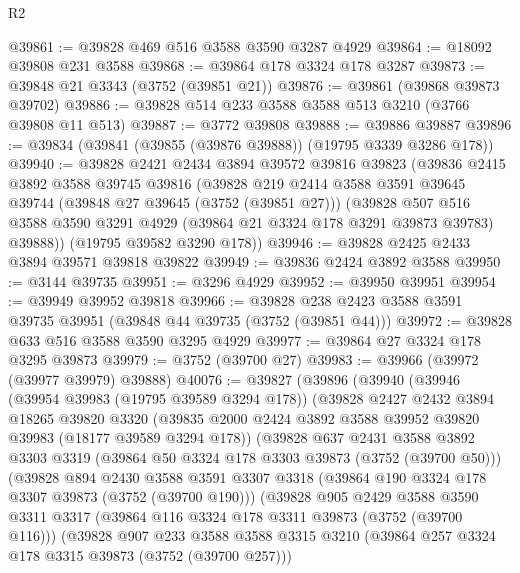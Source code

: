 \begin{lexlean}{R2}
\begin{coremodule}
@39861 := @39828 @469 @516 @3588 @3590 @3287 @4929
@39864 := @18092 @39808 @231 @3588
@39868 := @39864 @178 @3324 @178 @3287
@39873 := @39848 @21 @3343 (@3752 (@39851 @21))
@39876 := @39861 (@39868 @39873 @39702)
@39886 := @39828 @514 @233 @3588 @3588 @513 @3210 (@3766 @39808 @11 @513)
@39887 := @3772 @39808
@39888 := @39886 @39887
@39896 := @39834 (@39841 (@39855 (@39876 @39888)) (@19795 @3339 @3286 @178))
@39940 := @39828
    @2421
    @2434
    @3894
    @39572
    @39816
    @39823
    (@39836
      @2415
      @3892
      @3588
      @39745
      @39816
      (@39828
        @219
        @2414
        @3588
        @3591
        @39645
        @39744
        (@39848 @27 @39645 (@3752 (@39851 @27)))
        (@39828
          @507
          @516
          @3588
          @3590
          @3291
          @4929
          (@39864 @21 @3324 @178 @3291 @39873 @39783)
          @39888))
      (@19795 @39582 @3290 @178))
@39946 := @39828 @2425 @2433 @3894 @39571 @39818 @39822
@39949 := @39836 @2424 @3892 @3588
@39950 := @3144 @39735
@39951 := @3296 @4929
@39952 := @39950 @39951
@39954 := @39949 @39952 @39818
@39966 := @39828 @238 @2423 @3588 @3591 @39735 @39951 (@39848 @44 @39735 (@3752 (@39851 @44)))
@39972 := @39828 @633 @516 @3588 @3590 @3295 @4929
@39977 := @39864 @27 @3324 @178 @3295 @39873
@39979 := @3752 (@39700 @27)
@39983 := @39966 (@39972 (@39977 @39979) @39888)
@40076 := @39827
    (@39896
      (@39940
        (@39946
          (@39954 @39983 (@19795 @39589 @3294 @178))
          (@39828
            @2427
            @2432
            @3894
            @18265
            @39820
            @3320
            (@39835 @2000 @2424 @3892 @3588 @39952 @39820 @39983 (@18177 @39589 @3294 @178))
            (@39828
              @637
              @2431
              @3588
              @3892
              @3303
              @3319
              (@39864 @50 @3324 @178 @3303 @39873 (@3752 (@39700 @50)))
              (@39828
                @894
                @2430
                @3588
                @3591
                @3307
                @3318
                (@39864 @190 @3324 @178 @3307 @39873 (@3752 (@39700 @190)))
                (@39828
                  @905
                  @2429
                  @3588
                  @3590
                  @3311
                  @3317
                  (@39864 @116 @3324 @178 @3311 @39873 (@3752 (@39700 @116)))
                  (@39828
                    @907
                    @233
                    @3588
                    @3588
                    @3315
                    @3210
                    (@39864 @257 @3324 @178 @3315 @39873 (@3752 (@39700 @257)))

\end{coremodule}
\end{lexlean}
